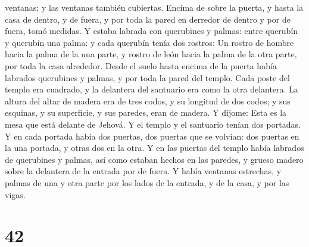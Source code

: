 ventanas; y las ventanas también cubiertas.  Encima de
sobre la puerta, y hasta la casa de dentro, y de fuera, y por toda la
pared en derredor de dentro y por de fuera, tomó medidas. 
Y estaba labrada con querubines y palmas: entre querubín y querubín una
palma: y cada querubín tenía dos rostros:  Un rostro de
hombre hacia la palma de la una parte, y rostro de león hacia la palma
de la otra parte, por toda la casa alrededor.  Desde el
suelo hasta encima de la puerta había labrados querubines y palmas, y
por toda la pared del templo.  Cada poste del templo era
cuadrado, y la delantera del santuario era como la otra delantera.
 La altura del altar de madera era de tres codos, y su
longitud de dos codos; y sus esquinas, y su superficie, y sus paredes,
eran de madera. Y díjome: Esta es la mesa que está delante de Jehová.
 Y el templo y el santuario tenían dos portadas.
 Y en cada portada había dos puertas, dos puertas que se
volvían: dos puertas en la una portada, y otras dos en la otra.
 Y en las puertas del templo había labrados de querubines y
palmas, así como estaban hechos en las paredes, y grueso madero sobre la
delantera de la entrada por de fuera.  Y había ventanas
estrechas, y palmas de una y otra parte por los lados de la entrada, y
de la casa, y por las vigas.

\hypertarget{section-41}{%
\section{42}\label{section-41}}

